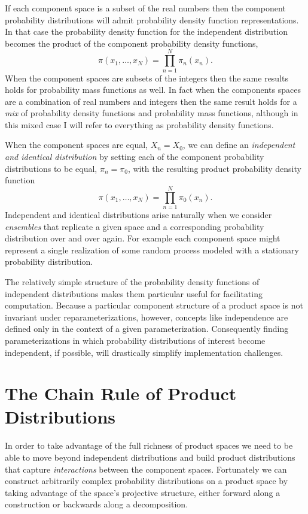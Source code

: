 \documentclass[]{article}
\begin{document}
If each component space is a subset of the real numbers then the
component probability distributions will admit probability density
function representations. In that case the probability density function
for the independent distribution becomes the product of the component
probability density functions, \[
\pi(x_{1}, \ldots, x_{N})
= \prod_{n = 1}^{N} \pi_{n}(x_{n}).
\] When the component spaces are subsets of the integers then the same
results holds for probability mass functions as well. In fact when the
components spaces are a combination of real numbers and integers then
the same result holds for a \emph{mix} of probability density functions
and probability mass functions, although in this mixed case I will refer
to everything as probability density functions.

When the component spaces are equal, \(X_{n} = X_{0}\), we can define an
\emph{independent and identical distribution} by setting each of the
component probability distributions to be equal, \(\pi_{n} = \pi_{0}\),
with the resulting product probability density function \[
\pi(x_{1}, \ldots, x_{N})
= \prod_{n = 1}^{N} \pi_{0}(x_{n}).
\] Independent and identical distributions arise naturally when we
consider \emph{ensembles} that replicate a given space and a
corresponding probability distribution over and over again. For example
each component space might represent a single realization of some random
process modeled with a stationary probability distribution.

The relatively simple structure of the probability density functions of
independent distributions makes them particular useful for facilitating
computation. Because a particular component structure of a product space
is not invariant under reparameterizations, however, concepts like
independence are defined only in the context of a given
parameterization. Consequently finding parameterizations in which
probability distributions of interest become independent, if possible,
will drastically simplify implementation challenges.

\hypertarget{sec:chain_rule}{%
\section{The Chain Rule of Product Distributions}\label{sec:chain_rule}}

In order to take advantage of the full richness of product spaces we
need to be able to move beyond independent distributions and build
product distributions that capture \emph{interactions} between the
component spaces. Fortunately we can construct arbitrarily complex
probability distributions on a product space by taking advantage of the
space's projective structure, either forward along a construction or
backwards along a decomposition.
\end{document}
